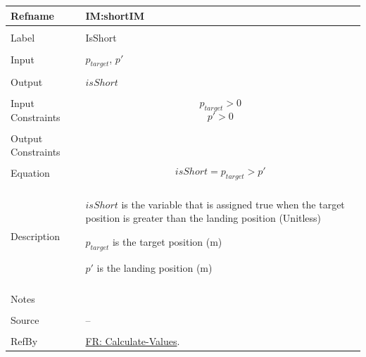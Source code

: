 \documentclass[12pt]{article}
\begin{document}
\noindent \begin{minipage}{\textwidth}
\begin{tabular}{p{} p{}}
\toprule \textbf{Refname} & \textbf{IM:shortIM}
\label{IM:shortIM}
\\ \midrule \\
Label & IsShort
\\ \midrule \\
Input & ${p_{target}}$, $p'$
\\ \midrule \\
Output & $isShort$
\\ \midrule \\
Input Constraints & \begin{displaymath}
                    {p_{target}}>0
                    \end{displaymath}
                    \begin{displaymath}
                    p'>0
                    \end{displaymath}
\\ \midrule \\
Output Constraints & 
\\ \midrule \\
Equation & \begin{displaymath}
           isShort={p_{target}}>p'
           \end{displaymath}
\\ \midrule \\
Description & \begin{symbDescription}
              \item{$isShort$ is the variable that is assigned true when the target position is greater than the landing position (Unitless)}
              \item{${p_{target}}$ is the target position (m)}
              \item{$p'$ is the landing position (m)}
              \end{symbDescription}
\\ \midrule \\
Notes & 
\\ \midrule \\
Source & --
\\ \midrule \\
RefBy & \hyperref[calcValues]{FR: Calculate-Values}.
\\ \bottomrule \end{tabular}
\end{minipage}
\par~
\end{document}
